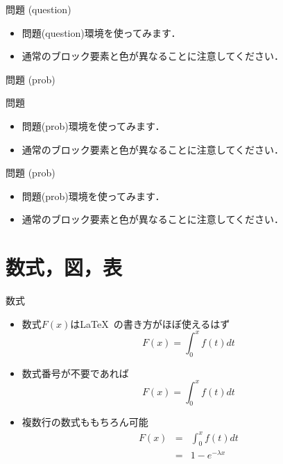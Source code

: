 \begin{frame}{問題 (question)}
  \begin{question}
    \begin{itemize}
      \item 問題(question)環境を使ってみます．
      \item 通常のブロック要素と色が異なることに注意してください．
    \end{itemize}
  \end{question}
\end{frame}

\begin{frame}{問題 (prob)}
  \begin{prob}{問題}
    \begin{itemize}
      \item 問題(prob)環境を使ってみます．
      \item 通常のブロック要素と色が異なることに注意してください．
    \end{itemize}
  \end{prob}
\end{frame}

\begin{frame}{問題 (prob)}
  \begin{prob}
    \begin{itemize}
      \item 問題(prob)環境を使ってみます．
      \item 通常のブロック要素と色が異なることに注意してください．
    \end{itemize}
  \end{prob}
\end{frame}

\section{数式，図，表}

\begin{frame}{数式}
  \begin{itemize}
    \item 数式$F(x)$は\LaTeX~の書き方がほぼ使えるはず
    \begin{equation}
      F(x) = \int_{0}^{x}f(t)dt
    \end{equation}
    \item 数式番号が不要であれば
    \begin{equation*}
      F(x) = \int_{0}^{x}f(t)dt
    \end{equation*}
    \item 複数行の数式ももちろん可能
    \begin{eqnarray*}
      F(x) &=& \int_{0}^{x}f(t)dt \\
      &=& 1 - e^{-\lambda x}
    \end{eqnarray*}
  \end{itemize}
\end{frame}

